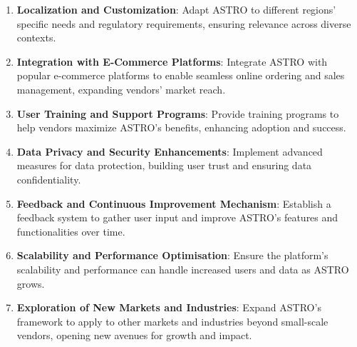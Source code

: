 \begin{enumerate}
    \item \textbf{Localization and Customization}: Adapt ASTRO to different regions’ specific needs and regulatory requirements, ensuring relevance across diverse contexts.
    \item \textbf{Integration with E-Commerce Platforms}: Integrate ASTRO with popular e-commerce platforms to enable seamless online ordering and sales management, expanding vendors’ market reach.
    \item \textbf{User Training and Support Programs}: Provide training programs to help vendors maximize ASTRO’s benefits, enhancing adoption and success.
    \item \textbf{Data Privacy and Security Enhancements}: Implement advanced measures for data protection, building user trust and ensuring data confidentiality.
    \item \textbf{Feedback and Continuous Improvement Mechanism}: Establish a feedback system to gather user input and improve ASTRO’s features and functionalities over time.
    \item \textbf{Scalability and Performance Optimisation}: Ensure the platform’s scalability and performance can handle increased users and data as ASTRO grows.
    \item \textbf{Exploration of New Markets and Industries}: Expand ASTRO’s framework to apply to other markets and industries beyond small-scale vendors, opening new avenues for growth and impact.
\end{enumerate}